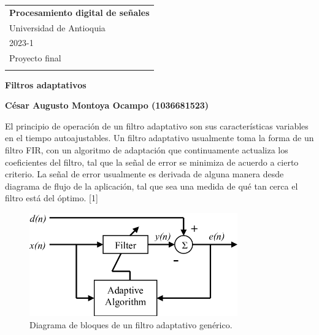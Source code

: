 \documentclass[a4paper,12pt]{article} %
\begin{document}
\thispagestyle{empty} %

\begin{tabular}{p{15.5cm}} %
{\large \bf Procesamiento digital de señales} \\
Universidad de Antioquia \\ 2023-1  \\ Proyecto final \\
\hline %
\\
\end{tabular} %

\vspace*{0.3cm} %

\begin{center} %
	{\Large \bf Filtros adaptativos} %
	\vspace{2mm}
	
	{\bf César Augusto Montoya Ocampo (1036681523)} %
		
\end{center}  

\vspace{0.4cm}

El principio de operación de un filtro adaptativo son sus características variables en el tiempo autoajustables. Un filtro adaptativo usualmente toma la forma de un filtro FIR, con un algoritmo de adaptación que continuamente actualiza los coeficientes del filtro, tal que la señal de error se minimiza de acuerdo a cierto criterio. La señal de error usualmente es derivada de alguna manera desde diagrama de flujo de la aplicación, tal que sea una medida de qué tan cerca el filtro está del óptimo. [1]

\begin{figure}[H]
    \centering %
    \includegraphics[width=0.8\textwidth]{block-diagram.png} 
    \caption{Diagrama de bloques de un filtro adaptativo genérico.}
\end{figure}
\end{document}

